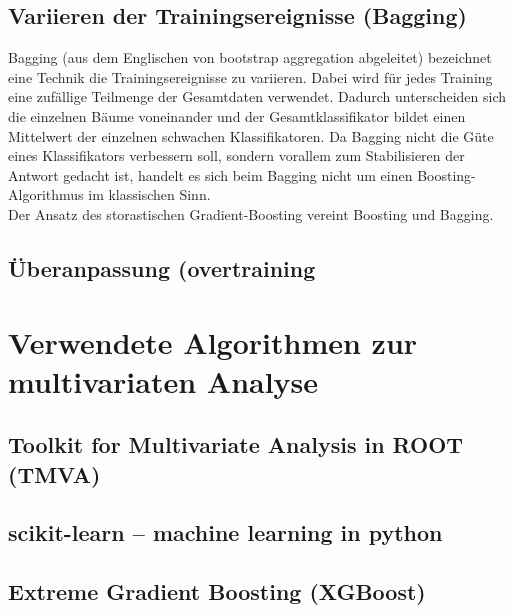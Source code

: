 \subsection{Variieren der Trainingsereignisse (Bagging)}
\label{ch:Algorithmen:subsec:Bagging}

Bagging (aus dem Englischen von bootstrap aggregation abgeleitet) bezeichnet eine Technik die Trainingsereignisse zu variieren. Dabei wird für jedes Training eine zufällige Teilmenge der Gesamtdaten verwendet. Dadurch unterscheiden sich die einzelnen Bäume voneinander und der Gesamtklassifikator bildet einen Mittelwert der einzelnen schwachen Klassifikatoren. Da Bagging nicht die Güte eines Klassifikators verbessern soll, sondern vorallem zum Stabilisieren der Antwort gedacht ist, handelt es sich beim Bagging nicht um einen Boosting-Algorithmus im klassischen Sinn. \cite{Hocker:2007ht}\\
Der Ansatz des storastischen Gradient-Boosting vereint Boosting und Bagging.

\subsection{Überanpassung (overtraining}
\label{ch:Algorithmen:subsec:overtraining}



\section{Verwendete Algorithmen zur multivariaten Analyse}
\label{ch:Algorithmen:subsec:Implementationen}

\subsection{Toolkit for Multivariate Analysis in ROOT (TMVA)}
\label{ch:Algorithmen:subsec:TMVA}

\subsection{scikit-learn -- machine learning in python}
\label{ch:Algorithmen:subsec:sklearn}

\subsection{Extreme Gradient Boosting (XGBoost)}
\label{ch:Algorithmen:subsec:XGB}
